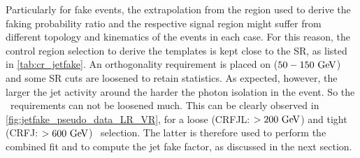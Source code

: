 Particularly for fake events, the extrapolation from the region used to derive the faking probability ratio and
the respective signal region might suffer from different topology and kinematics of the events in each case.
For this reason, the control region selection to derive the templates is kept close to the SR, as listed in {\tab} \ref{tab:cr_jetfake}.
An orthogonality requirement is placed on \MET ($50-150\gev$) and some SR cuts are loosened to retain statistics.
As expected, however, the larger the jet activity around the harder the photon isolation in the event. So the
\HT\ requirements can not be loosened much. This can be clearly observed in {\fig} \ref{fig:jetfake_pseudo_data_LR_VR},
for a loose (CRFJL: $>200 \gev$) and tight (CRFJ: $>600 \gev$) \HT\ selection. The latter is therefore used to
perform the combined fit and to compute the jet fake factor, as discussed in the next section.

